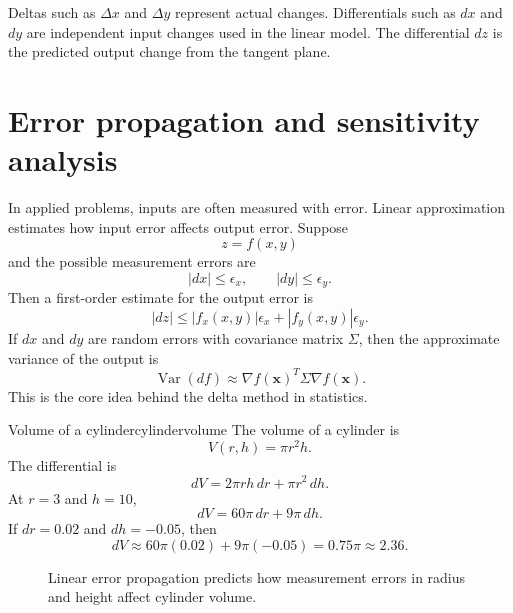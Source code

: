 \documentclass[11pt]{article}
\newcommand{\grad}{\nabla}
\newcommand{\Var}{\operatorname{Var}}
\begin{document}
\begin{notebox}
Deltas such as $\Delta x$ and $\Delta y$ represent actual changes. Differentials such as $dx$ and $dy$ are independent input changes used in the linear model. The differential $dz$ is the predicted output change from the tangent plane.
\end{notebox}

\section{Error propagation and sensitivity analysis}

In applied problems, inputs are often measured with error. Linear approximation estimates how input error affects output error. Suppose
\[
z=f(x,y)
\]
and the possible measurement errors are
\[
|dx|\le \epsilon_x,\qquad |dy|\le \epsilon_y.
\]
Then a first-order estimate for the output error is
\[
|dz|\le |f_x(x,y)|\epsilon_x+|f_y(x,y)|\epsilon_y.
\]
If $dx$ and $dy$ are random errors with covariance matrix $\Sigma$, then the approximate variance of the output is
\[
\Var(df)\approx \grad f(\mathbf{x})^T\Sigma\grad f(\mathbf{x}).
\]
This is the core idea behind the delta method in statistics.

\begin{examplebox}{Volume of a cylinder}{cylindervolume}
The volume of a cylinder is
\[
V(r,h)=\pi r^2h.
\]
The differential is
\[
dV=2\pi rh\,dr+\pi r^2\,dh.
\]
At $r=3$ and $h=10$,
\[
dV=60\pi\,dr+9\pi\,dh.
\]
If $dr=0.02$ and $dh=-0.05$, then
\[
dV\approx 60\pi(0.02)+9\pi(-0.05)=0.75\pi\approx 2.36.
\]
\end{examplebox}

\begin{figure}[H]
\centering
{}
\caption{Linear error propagation predicts how measurement errors in radius and height affect cylinder volume.}
\end{figure}
\end{document}

